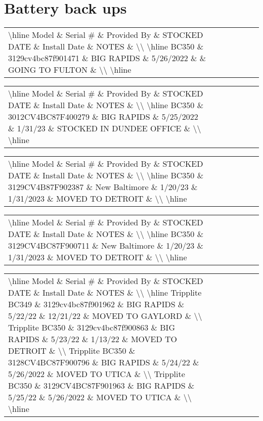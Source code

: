 \documentclass{article}%
\begin{document}
\section{Battery back ups }%
\label{sec:Batterybackups}%
\begin{tabularx}{\textwidth}{|X|X|X|X|X|X|X|}%
\textbackslash{}hline%
Model \& Serial \# \& Provided By \& STOCKED DATE \& Install Date \& NOTES \&  \textbackslash{}\textbackslash{}%
\textbackslash{}hline%
BC350 \& 3129cv4bc87f901471 \& BIG RAPIDS \& 5/26/2022 \&  \& GOING TO FULTON \&  \textbackslash{}\textbackslash{}%
\textbackslash{}hline%
\end{tabularx}%
\begin{tabularx}{\textwidth}{|X|X|X|X|X|X|X|}%
\textbackslash{}hline%
Model \& Serial \# \& Provided By \& STOCKED DATE \& Install Date \& NOTES \&  \textbackslash{}\textbackslash{}%
\textbackslash{}hline%
BC350 \& 3012CV4BC87F400279 \& BIG RAPIDS \& 5/25/2022 \& 1/31/23 \& STOCKED IN DUNDEE OFFICE \&  \textbackslash{}\textbackslash{}%
\textbackslash{}hline%
\end{tabularx}%
\begin{tabularx}{\textwidth}{|X|X|X|X|X|X|X|}%
\textbackslash{}hline%
Model \& Serial \# \& Provided By \& STOCKED DATE \& Install Date \& NOTES \&  \textbackslash{}\textbackslash{}%
\textbackslash{}hline%
BC350 \& 3129CV4B87F902387 \& New Baltimore \& 1/20/23 \& 1/31/2023 \& MOVED TO DETROIT \&  \textbackslash{}\textbackslash{}%
\textbackslash{}hline%
\end{tabularx}%
\begin{tabularx}{\textwidth}{|X|X|X|X|X|X|X|}%
\textbackslash{}hline%
Model \& Serial \# \& Provided By \& STOCKED DATE \& Install Date \& NOTES \&  \textbackslash{}\textbackslash{}%
\textbackslash{}hline%
BC350 \& 3129CV4BC87F900711 \& New Baltimore \& 1/20/23 \& 1/31/2023 \& MOVED TO DETROIT \&  \textbackslash{}\textbackslash{}%
\textbackslash{}hline%
\end{tabularx}%
\begin{tabularx}{\textwidth}{|X|X|X|X|X|X|X|}%
\textbackslash{}hline%
Model \& Serial \# \& Provided By \& STOCKED DATE \& Install Date \& NOTES \&  \textbackslash{}\textbackslash{}%
\textbackslash{}hline%
Tripplite BC349 \& 3129cv4bc87f901962 \& BIG RAPIDS \& 5/22/22 \& 12/21/22 \& MOVED TO GAYLORD \&  \textbackslash{}\textbackslash{}%
Tripplite BC350 \& 3129cv4bc87f900863 \& BIG RAPIDS \& 5/23/22 \& 1/13/22 \& MOVED TO DETROIT \&  \textbackslash{}\textbackslash{}%
Tripplite BC350 \& 3128CV4BC87F900796 \& BIG RAPIDS \& 5/24/22 \& 5/26/2022 \& MOVED TO UTICA \&  \textbackslash{}\textbackslash{}%
Tripplite BC350 \& 3129CV4BC87F901963 \& BIG RAPIDS \& 5/25/22 \& 5/26/2022 \&  MOVED TO UTICA \&  \textbackslash{}\textbackslash{}%
\textbackslash{}hline%
\end{tabularx}
\end{document}
